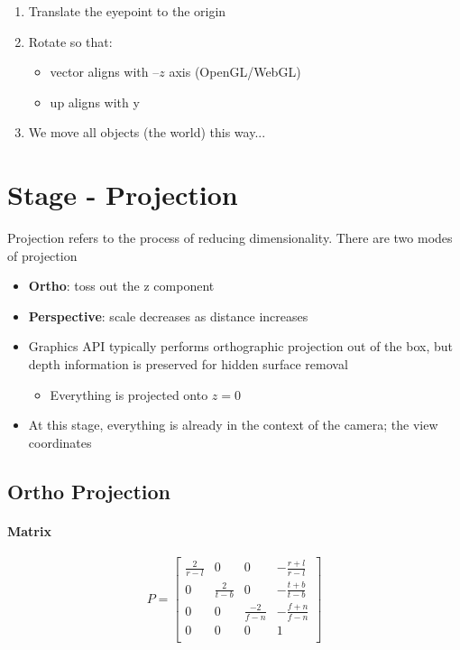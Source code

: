     \begin{enumerate}
      \item Translate the eyepoint to the origin
      \item Rotate so that:
      \begin{itemize}
        \item {} vector aligns with $ –z $ axis (OpenGL/WebGL)
        \item up aligns with y
      \end{itemize}

      \item We move all objects (the world) this way...
    \end{enumerate}

\section{Stage - Projection}

  Projection refers to the process of reducing dimensionality. There are two
  modes of projection

  \begin{itemize}
    \item \textbf{Ortho}: toss out the z component
    \item \textbf{Perspective}: scale decreases as distance increases
    \item Graphics API typically performs orthographic projection out of
    the box, but depth information is preserved for hidden surface removal
    \begin{itemize}
      \item Everything is projected onto $ z = 0 $
    \end{itemize}

    \item At this stage, everything is already in the context of the camera;
    the view coordinates
  \end{itemize}

  \subsection{Ortho Projection}

    \paragraph{Matrix}
    \begin{equation}
      P =
      \begin{bmatrix}
        \frac{2}{r - l} & 0 & 0 & -\frac{r + l}{r - l} \\
        0 & \frac{2}{t - b} & 0 & -\frac{t + b}{t - b} \\
        0 & 0 & \frac{-2}{f - n} & -\frac{f + n}{f - n} \\
        0 & 0 & 0 & 1 \\
      \end{bmatrix}
    \end{equation}

